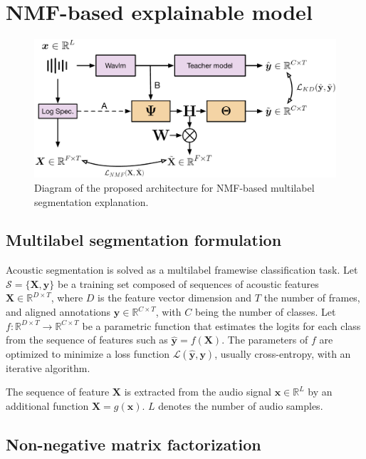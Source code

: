 \section{NMF-based explainable model}

\begin{figure}[ht]
    \centering
    \includegraphics[width=\linewidth]{figs/nmf_model_icassp.pdf}
    \caption{Diagram of the proposed architecture for NMF-based multilabel segmentation explanation.}
    \label{fig:enter-label}
\end{figure}

\subsection{Multilabel segmentation formulation}

Acoustic segmentation is solved as a multilabel framewise classification task.
Let $\mathcal{S}=\{\mathbf{X}, \mathbf{y}\}$ be a training set composed of sequences of acoustic features $\mathbf{X}\in\mathbb{R}^{D\times T}$, where $D$ is the feature vector dimension and $T$ the number of frames, and aligned annotations $\mathbf{y}\in \mathbb{R}^{C\times T}$, with $C$ being the number of classes. 
Let $f:\mathbb{R}^{D\times T} \rightarrow \mathbb{R}^{C\times T}$ be a parametric function that estimates the logits for each class from the sequence of features such as $\hat{\mathbf{y}}=f(\mathbf{X})$.
The parameters of $f$ are optimized to minimize a loss function $\mathcal{L}(\hat{\mathbf{y}},\mathbf{y})$, usually cross-entropy, with an iterative algorithm.

The sequence of feature $\mathbf{X}$ is extracted from the audio signal $\mathbf{x}\in\mathbb{R}^{L}$ by an additional function $\mathbf{X}=g(\mathbf{x})$. 
$L$ denotes the number of audio samples.

\subsection{Non-negative matrix factorization}

